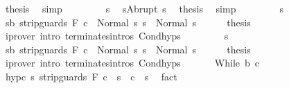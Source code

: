 \begin{isabellebody}
\ {\isacharquery}thesis\ \isamarkupfalse%
\ simp\isanewline
\ \ \isamarkupfalse%
\isanewline
\ \ \ \ \isamarkupfalse%
\ s{\isacharprime}\ \isamarkupfalse%
\ {\isachardoublequoteopen}s{\isacharequal}Abrupt\ s{\isacharprime}{\isachardoublequoteclose}\ \isamarkupfalse%
\ {\isacharquery}thesis\ \isamarkupfalse%
\ simp\isanewline
\ \ \isamarkupfalse%
\isanewline
\ \ \ \ \isamarkupfalse%
\ s{\isacharprime}\isanewline
\ \ \ \ \isamarkupfalse%
\ {\isachardoublequoteopen}s{\isacharprime}{\isasymin}b{\isachardoublequoteclose}\ {\isachardoublequoteopen}{\isasymGamma}{\isasymturnstile}strip{\isacharunderscore}guards\ F\ c{}\ {\isasymdown}\ Normal\ s{\isacharprime}{\isachardoublequoteclose}\ {\isachardoublequoteopen}s\ {\isacharequal}\ Normal\ s{\isacharprime}{\isachardoublequoteclose}\isanewline
\ \ \ \ \isamarkupfalse%
\ {\isacharquery}thesis\isanewline
\ \ \ \ \ \ \isamarkupfalse%
\ {\isacharparenleft}iprover\ intro{\isacharcolon}\ terminates{\isachardot}intros\ Cond{\isachardot}hyps{\isacharparenright}\isanewline
\ \ \isamarkupfalse%
\isanewline
\ \ \ \ \isamarkupfalse%
\ s{\isacharprime}\isanewline
\ \ \ \ \isamarkupfalse%
\ {\isachardoublequoteopen}s{\isacharprime}{\isasymnotin}b{\isachardoublequoteclose}\ {\isachardoublequoteopen}{\isasymGamma}{\isasymturnstile}strip{\isacharunderscore}guards\ F\ c{}\ {\isasymdown}\ Normal\ s{\isacharprime}{\isachardoublequoteclose}\ {\isachardoublequoteopen}s\ {\isacharequal}\ Normal\ s{\isacharprime}{\isachardoublequoteclose}\isanewline
\ \ \ \ \isamarkupfalse%
\ {\isacharquery}thesis\isanewline
\ \ \ \ \ \ \isamarkupfalse%
\ {\isacharparenleft}iprover\ intro{\isacharcolon}\ terminates{\isachardot}intros\ Cond{\isachardot}hyps{\isacharparenright}\isanewline
\ \ \isamarkupfalse%
\isanewline
{}\isamarkupfalse%
\isanewline
\ \ \isamarkupfalse%
\ {\isacharparenleft}While\ b\ c{\isacharparenright}\isanewline
\ \ \isamarkupfalse%
\ hyp{\isacharunderscore}c{\isacharcolon}\ {\isachardoublequoteopen}{\isasymAnd}s{\isachardot}\ {\isasymGamma}{\isasymturnstile}strip{\isacharunderscore}guards\ F\ c\ {\isasymdown}\ s\ {\isasymLongrightarrow}\ {\isasymGamma}{\isasymturnstile}c\ {\isasymdown}\ s{\isachardoublequoteclose}\ \isamarkupfalse%
\ fact\isanewline
\ \ \isamarkupfalse%

\end{isabellebody}
